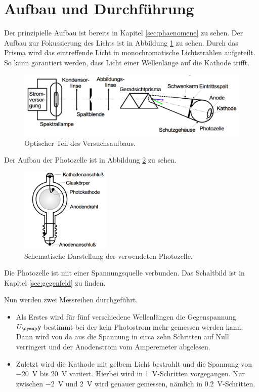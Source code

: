  \section{Aufbau und Durchführung}
\label{sec:Durchführung}

Der prinzipielle Aufbau ist bereits in Kapitel \ref{sec:phaenomene}
zu sehen. Der Aufbau zur Fokussierung des Lichts ist in Abbildung
\ref{fig:optikaufbau} zu sehen. Durch das Prisma wird das eintreffende
Licht in monochromatische Lichtstrahlen aufgeteilt. So kann garantiert
werden, dass Licht einer Wellenlänge auf die Kathode trifft.

\begin{figure}[H]
  \centering
  \includegraphics[width = \textwidth]{NacktbilderMilaKunis/optikaufbau.pdf}
  \caption{Optischer Teil des Versuchsaufbaus\cite{anleitung}.}
  \label{fig:optikaufbau}
\end{figure}

Der Aufbau der Photozelle ist in Abbildung \ref{fig:photozelle}
zu sehen.

\begin{figure}[H]
  \centering
  \includegraphics[height = 4cm]{NacktbilderMilaKunis/photozelle.pdf}
  \caption{Schematische Darstellung der verwendeten Photozelle\cite{anleitung}.}
  \label{fig:photozelle}
\end{figure}

Die Photozelle ist mit einer Spannungsquelle verbunden. Das Schaltbild ist in Kapitel
\ref{sec:gegenfeld} zu finden.

Nun werden zwei Messreihen durchgeführt.

\begin{itemize}
  \item Als Erstes wird für fünf verschiedene Wellenlängen die Gegenspannung $U_\g{g}$
  bestimmt bei der kein Photostrom mehr gemessen werden kann. Dann wird von da aus
  die Spannung in circa zehn Schritten auf Null verringert und der Anodenstrom vom
  Amperemeter abgelesen.
  \item Zuletzt wird die Kathode mit gelbem Licht bestrahlt und die Spannung von
  \SI{-20}{\volt} bis \SI{20}{\volt} variiert. Hierbei wird in \SI{1}{\volt}-Schritten
  vorgegangen. Nur zwischen \SI{-2}{\volt} und \SI{2}{\volt} wird genauer gemessen, nämlich
  in \SI{0.2}{\volt}-Schritten.
\end{itemize}

